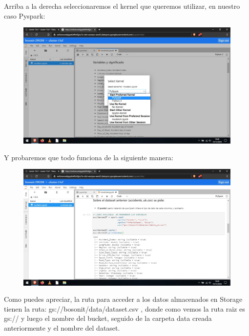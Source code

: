 \documentclass[a4paper,10pt]{article}
\begin{document}
Arriba a la derecha seleccionaremos el kernel que queremos utilizar, en nuestro caso Pyspark:

\begin{figure}[H]
\begin{center}
\includegraphics[width=500pt]{./fotos/GoogleCloud/48 - GC.jpg}
\end{center}
\end{figure}

Y probaremos que todo funciona de la siguiente manera:

\begin{figure}[H]
\begin{center}
\includegraphics[width=500pt]{./fotos/GoogleCloud/49 - GC.jpg}
\end{center}
\end{figure}

Como puedes apreciar, la ruta para acceder a los datos almacenados en Storage tienen la ruta: gs://bosonit/data/dataset.csv , donde como vemos la ruta raiz es gs:// y luego el nombre del bucket, seguido de la carpeta data creada anteriormente y el nombre del dataset.
\end{document}
